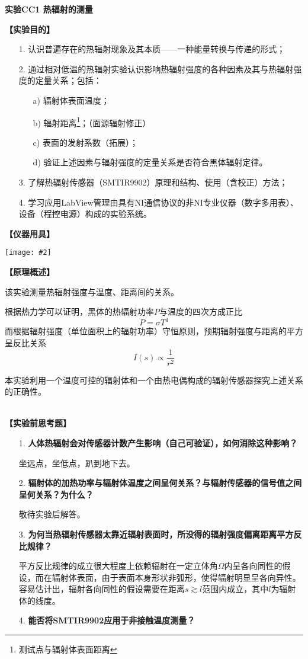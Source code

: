 \documentclass[11pt,a4paper]{ctexart}
\newcommand{\ExpeName}{实验CC1 热辐射的测量}
\newcommand{\cpic}[2]{
\begin{center}
\texttt{[image: \#2]}
\end{center}
}
\newcommand{\beq}{\begin{equation}}
\newcommand{\eeq}{\end{equation}}
\newcommand{\emptyline}{\par \ \\}
\begin{document}
\newpage%
\begin{center}
\LARGE{\textbf{\ExpeName}}
\end{center}
\textbf{【实验目的】}
\begin{enumerate}
 \item[1.] 认识普遍存在的热辐射现象及其本质——一种能量转换与传递的形式；
 \item[2.] 通过相对低温的热辐射实验认识影响热辐射强度的各种因素及其与热辐射强度的定量关系；包括：
\begin{enumerate}
\item[a)] 辐射体表面温度；
\item[b)] 辐射距离\footnote{测试点与辐射体表面距离}；（面源辐射修正）
\item[c)] 表面的发射系数（拓展）；
\item[d)] 验证上述因素与辐射强度的定量关系是否符合黑体辐射定律。
\end{enumerate}
 \item[3.] 了解热辐射传感器（SMTIR9902）原理和结构、使用（含校正）方法；
 \item[4.] 学习应用LabView管理由具有NI通信协议的非NI专业仪器（数字多用表）、设备（程控电源）构成的实验系统。
\end{enumerate}
\textbf{【仪器用具】}
\cpic{0.3}{t1}
\textbf{【原理概述】}\par
该实验测量热辐射强度与温度、距离间的关系。\par
根据热力学可以证明，黑体的热辐射功率$P$与温度的四次方成正比
\beq
P = \sigma T^4
\eeq
而根据辐射强度（单位面积上的辐射功率）守恒原则，预期辐射强度与距离的平方呈反比关系
\beq
I(s) \propto \frac{1}{r^2}
\eeq
\par
本实验利用一个温度可控的辐射体和一个由热电偶构成的辐射传感器探究上述关系的正确性。
\emptyline
\textbf{【实验前思考题】}
\begin{enumerate}
 \item[1.]\textbf{人体热辐射会对传感器计数产生影响（自己可验证），如何消除这种影响？}\par
坐远点，坐低点，趴到地下去。
 \item[2.]\textbf{辐射体的加热功率与辐射体温度之间呈何关系？与辐射传感器的信号值之间呈何关系？为什么？}\par
敬待实验后解答。
 \item[3.]\textbf{为何当热辐射传感器太靠近辐射表面时，所没得的辐射强度偏离距离平方反比规律？}\par
平方反比规律的成立很大程度上依赖辐射在一定立体角$\varOmega$内呈各向同性的假设，而在辐射体表面，由于表面本身形状非弧形，使得辐射明显呈各向异性。容易估计出，辐射各向同性的假设需要在距离$s \gtrsim l$范围内成立，其中$l$为辐射体的线度。
 \item[4.]\textbf{能否将SMTIR9902应用于非接触温度测量？}\par
\end{enumerate}
\end{document}
